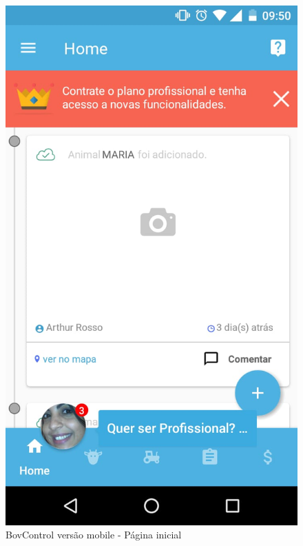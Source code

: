 \documentclass[12pt]{article}
\begin{document}
\begin{titlepage}
\begin{figure}[!h]
\begin{center}
\end{center}
\end{figure}


\begin{figure}[!h]
\begin{center}
\caption{BovControl versão mobile - Página inicial}
\includegraphics[width=6in]{img/bovcontrolapp1.jpeg}

\end{center}
\end{figure}


\end{titlepage}
\end{document}

